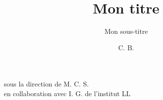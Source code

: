 \documentclass[english,10pt]{beamer}
\title{Mon titre}
\subtitle{Mon sous-titre}
\author{C. B.}
\institute{Le Laboratoire\\
  Université de G\"ottingen}
\begin{document}
  \begin{frame}
      \titlepage
    \centering
  sous la direction de M. C. S.\\
  en collaboration avec I. G. de l'institut LL 
  \end{frame}
\end{document}
